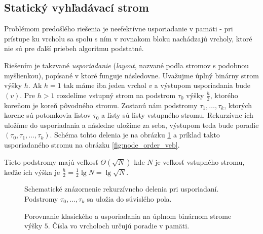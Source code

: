 \subsection{Statický \obliv vyhľadávací strom} \label{sec:static-obliv}
Problémom predošlého riešenia je neefektívne usporiadanie v pamäti - pri prístupe ku vrcholu sa spolu s ním v rovnakom bloku nachádzajú vrcholy, ktoré nie sú pre ďalší priebeh algoritmu podstatné. 

Riešením je takzvané \emph{\vEB usporiadanie} (\emph{\vEB layout}, nazvané podla \vEB stromov s podobnou myšlienkou), popísané v \citep{prokop1999cache,btreeshort,demaineoverview} ktoré funguje následovne. Uvažujme úplný binárny strom výšky $h$. Ak $h=1$ tak máme iba jeden vrchol $v$ a výstupom usporiadania bude $(v)$.
Pre $h>1$ rozdelíme vstupný strom na podstrom $\tau_0$ výšky $\frac{h}{2}$, ktorého koreňom je koreň pôvodného stromu. Zostanú nám podstromy $\tau_1,\dotsc,\tau_k$, ktorých korene sú potomkovia listov $\tau_0$ a listy sú listy vstupného stromu. Rekurzívne ich uložíme do \vEB usporiadania a následne uložíme za seba, výstupom teda bude poradie $(\tau_0,\tau_1,\dotsc,\tau_k)$. Schéma tohto delenia je na obrázku \ref{fig:veblayout_scheme} a príklad takto usporiadaného stromu na obrázku \ref{fig:node_order_veb}.

Tieto podstromy majú veľkosť $\Theta(\sqrt{N})$ kde $N$ je veľkosť vstupného stromu, keďže ich výška je $\frac{h}{2} = \frac{1}{2}\lg{N} = \lg{\sqrt{N}}$.

\begin{figure}
    \centering
    \resizebox{0.4\textwidth}{!}{
        
    }
    \caption{Schematické znázornenie rekurzívneho delenia pri \vEB usporiadaní. Podstromy $\tau_0,\dotsc,\tau_k$ sa uložia do súvislého pola.}
    \label{fig:veblayout_scheme}
\end{figure}

\begin{figure}
    \centering
    \caption{Porovnanie klasického a \vEB usporiadania na úplnom binárnom strome výšky $5$. Čísla vo vrcholoch určujú poradie v pamäti.}
    \label{fig:node_order_comparison}
\end{figure}

